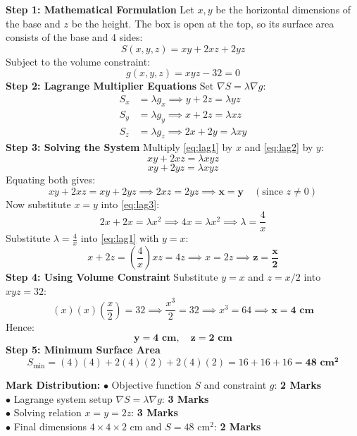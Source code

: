 \begin{solutionbox}
\textbf{Step 1: Mathematical Formulation}
Let $x, y$ be the horizontal dimensions of the base and $z$ be the height.
The box is open at the top, so its surface area consists of the base and 4 sides:
\[
S(x,y,z) = xy + 2xz + 2yz
\]
Subject to the volume constraint:
\[
g(x,y,z) = xyz - 32 = 0
\]
\textbf{Step 2: Lagrange Multiplier Equations}
Set $\nabla S = \lambda \nabla g$:
\begin{align}
S_x &= \lambda g_x \implies y + 2z = \lambda yz \label{eq:lag1} \\
S_y &= \lambda g_y \implies x + 2z = \lambda xz \label{eq:lag2} \\
S_z &= \lambda g_z \implies 2x + 2y = \lambda xy \label{eq:lag3}
\end{align}
\textbf{Step 3: Solving the System}
Multiply \eqref{eq:lag1} by $x$ and \eqref{eq:lag2} by $y$:
\[
xy + 2xz = \lambda xyz
\]
\[
xy + 2yz = \lambda xyz
\]
Equating both gives:
\[
xy + 2xz = xy + 2yz \implies 2xz = 2yz \implies \mathbf{x = y} \quad (\text{since } z \neq 0)
\]
Now substitute $x = y$ into \eqref{eq:lag3}:
\[
2x + 2x = \lambda x^2 \implies 4x = \lambda x^2 \implies \lambda = \frac{4}{x}
\]
Substitute $\lambda = \frac{4}{x}$ into \eqref{eq:lag1} with $y = x$:
\[
x + 2z = \left(\frac{4}{x}\right) x z = 4z \implies x = 2z \implies \mathbf{z = \frac{x}{2}}
\]
\textbf{Step 4: Using Volume Constraint}
Substitute $y = x$ and $z = x/2$ into $xyz = 32$:
\[
(x)(x)\left(\frac{x}{2}\right) = 32 \implies \frac{x^3}{2} = 32 \implies x^3 = 64 \implies \mathbf{x = 4\text{ cm}}
\]
Hence:
\[
\mathbf{y = 4\text{ cm}}, \quad \mathbf{z = 2\text{ cm}}
\]
\textbf{Step 5: Minimum Surface Area}
\[
S_{\min} = (4)(4) + 2(4)(2) + 2(4)(2) = 16 + 16 + 16 = \mathbf{48\text{ cm}^2}
\]

\begin{markingrubric}
\textbf{Mark Distribution:}
$\bullet$ Objective function $S$ and constraint $g$: \textbf{2 Marks}\\
$\bullet$ Lagrange system setup $\nabla S = \lambda \nabla g$: \textbf{3 Marks}\\
$\bullet$ Solving relation $x = y = 2z$: \textbf{3 Marks}\\
$\bullet$ Final dimensions $4 \times 4 \times 2\text{ cm}$ and $S = 48\text{ cm}^2$: \textbf{2 Marks}
\end{markingrubric}
\end{solutionbox}

